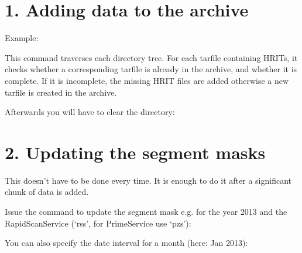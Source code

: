 \documentclass[letterpaper,10pt,english]{sphinxmanual}
\begin{document}
\section{1. Adding data to the archive}
\label{\detokenize{filling_gaps:adding-data-to-the-archive}}

Example:



This command traverses each directory tree. For each tarfile containing
HRITs, it checks whether a corresponding tarfile is already in the
archive, and whether it is complete. If it is incomplete, the missing
HRIT files are added otherwise a new tarfile is created in the archive.

Afterwards you will have to clear the directory:



\section{2. Updating the segment masks}
\label{\detokenize{filling_gaps:updating-the-segment-masks}}
This doesn’t have to be done every time. It is enough to do it after a
significant chunk of data is added.

Issue the command to update the segment mask e.g. for the year 2013 and
the Rapid\sphinxhyphen{}Scan\sphinxhyphen{}Service (‘rss’, for Prime\sphinxhyphen{}Service use ‘pzs’):


You can also specify the date interval for a month (here: Jan 2013):

\end{document}
